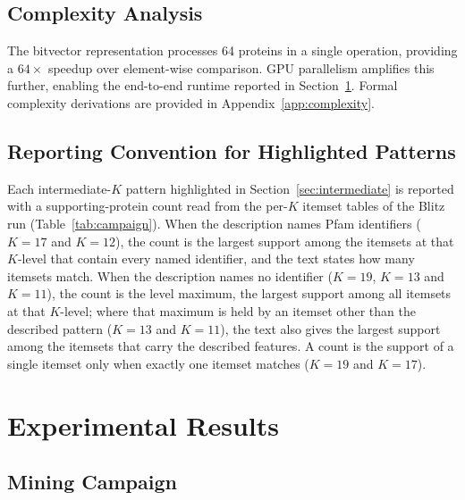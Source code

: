 \documentclass[10pt,a4paper,twocolumn]{article}
\begin{document}
\subsection{Complexity Analysis}

The bitvector representation processes 64 proteins in a single operation,
providing a $64\times$ speedup over element-wise comparison. GPU parallelism
amplifies this further, enabling the end-to-end runtime reported in
Section~\ref{sec:results}. Formal complexity derivations are provided
in Appendix~\ref{app:complexity}.

\subsection{Reporting Convention for Highlighted Patterns}
\label{sec:reporting}

Each intermediate-$K$ pattern highlighted in Section~\ref{sec:intermediate} is reported with a supporting-protein count read from the per-$K$ itemset tables of the Blitz run (Table~\ref{tab:campaign}). When the description names Pfam identifiers ($K{=}17$ and $K{=}12$), the count is the largest support among the itemsets at that $K$-level that contain every named identifier, and the text states how many itemsets match. When the description names no identifier ($K{=}19$, $K{=}13$ and $K{=}11$), the count is the level maximum, the largest support among all itemsets at that $K$-level; where that maximum is held by an itemset other than the described pattern ($K{=}13$ and $K{=}11$), the text also gives the largest support among the itemsets that carry the described features. A count is the support of a single itemset only when exactly one itemset matches ($K{=}19$ and $K{=}17$).

\section{Experimental Results}
\label{sec:results}

\subsection{Mining Campaign}
\end{document}
